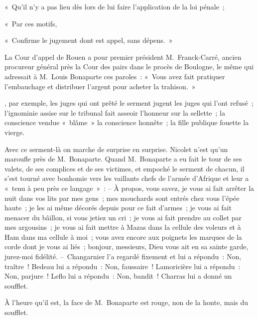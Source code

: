 \documentclass[french,twoside]{book} %
\begin{document}
{ « Qu’il n’y a pas lieu dès lors de lui faire l’application de la loi pénale ;\par
 « Par ces motifs,\par
 « Confirme le jugement dont est appel, sans dépens. »\par
 La Cour d’appel de Rouen a pour premier président M. Franck-Carré, ancien procureur général près la Cour des pairs dans le procès de Boulogne, le même qui adressait à M. Louis Bonaparte ces paroles : « Vous avez fait pratiquer l’embauchage et distribuer l’argent pour acheter la trahison. »
}, par exemple, les juges qui ont prêté le serment jugent les juges qui l’ont refusé ; l’ignominie assise sur le tribunal fait asseoir l’honneur sur la sellette ; la conscience vendue « blâme » la conscience honnête ; la fille publique fouette la vierge.\par
Avec ce serment-là on marche de surprise en surprise. Nicolet n’est qu’un maroufle près de M. Bonaparte. Quand M. Bonaparte a eu fait le tour de ses valets, de ses complices et de ses victimes, et empoché le serment de chacun, il s’est tourné avec bonhomie vers les vaillants chefs de l’armée d’Afrique et leur a « tenu à peu près ce langage » : – À propos, vous savez, je vous ai fait arrêter la nuit dans vos lits par mes gens ; mes mouchards sont entrés chez vous l’épée haute ; je les ai même décorés depuis pour ce fait d’armes ; je vous ai fait menacer du bâillon, si vous jetiez un cri ; je vous ai fait prendre au collet par mes argousins ; je vous ai fait mettre à Mazas dans la cellule des voleurs et à Ham dans ma cellule à moi ; vous avez encore aux poignets les marques de la corde dont je vous ai liés ; bonjour, messieurs, Dieu vous ait en sa sainte garde, jurez-moi fidélité. – Changarnier l’a regardé fixement et lui a répondu : Non, traître ! Bedeau lui a répondu : Non, faussaire ! Lamoricière lui a répondu : Non, parjure ! Leflo lui a répondu : Non, bandit ! Charras lui a donné un soufflet.\par
À l’heure qu’il est, la face de M. Bonaparte est rouge, non de la honte, mais du soufflet.\par
\end{document}
